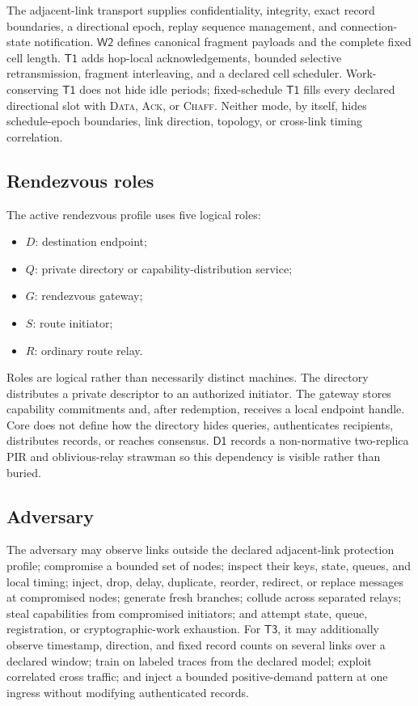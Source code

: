 \documentclass[11pt,oneside]{article}
\newcommand{\Wtwo}{\ensuremath{\mathsf{W2}}}
\newcommand{\Tone}{\ensuremath{\mathsf{T1}}}
\newcommand{\Tthree}{\ensuremath{\mathsf{T3}}}
\newcommand{\Done}{\ensuremath{\mathsf{D1}}}
\begin{document}
The adjacent-link transport supplies confidentiality, integrity, exact record boundaries, a directional epoch, replay sequence management, and connection-state notification. \Wtwo{} defines canonical fragment payloads and the complete fixed cell length. \Tone{} adds hop-local acknowledgements, bounded selective retransmission, fragment interleaving, and a declared cell scheduler. Work-conserving \Tone{} does not hide idle periods; fixed-schedule \Tone{} fills every declared directional slot with \textsc{Data}, \textsc{Ack}, or \textsc{Chaff}. Neither mode, by itself, hides schedule-epoch boundaries, link direction, topology, or cross-link timing correlation.

\subsection{Rendezvous roles}

The active rendezvous profile uses five logical roles:

\begin{itemize}
  \item $D$: destination endpoint;
  \item $Q$: private directory or capability-distribution service;
  \item $G$: rendezvous gateway;
  \item $S$: route initiator;
  \item $R$: ordinary route relay.
\end{itemize}

Roles are logical rather than necessarily distinct machines. The directory distributes a private descriptor to an authorized initiator. The gateway stores capability commitments and, after redemption, receives a local endpoint handle. Core does not define how the directory hides queries, authenticates recipients, distributes records, or reaches consensus. \Done{} records a non-normative two-replica PIR and oblivious-relay strawman so this dependency is visible rather than buried.

\subsection{Adversary}

The adversary may observe links outside the declared adjacent-link protection profile; compromise a bounded set of nodes; inspect their keys, state, queues, and local timing; inject, drop, delay, duplicate, reorder, redirect, or replace messages at compromised nodes; generate fresh branches; collude across separated relays; steal capabilities from compromised initiators; and attempt state, queue, registration, or cryptographic-work exhaustion. For \Tthree{}, it may additionally observe timestamp, direction, and fixed record counts on several links over a declared window; train on labeled traces from the declared model; exploit correlated cross traffic; and inject a bounded positive-demand pattern at one ingress without modifying authenticated records.
\end{document}

